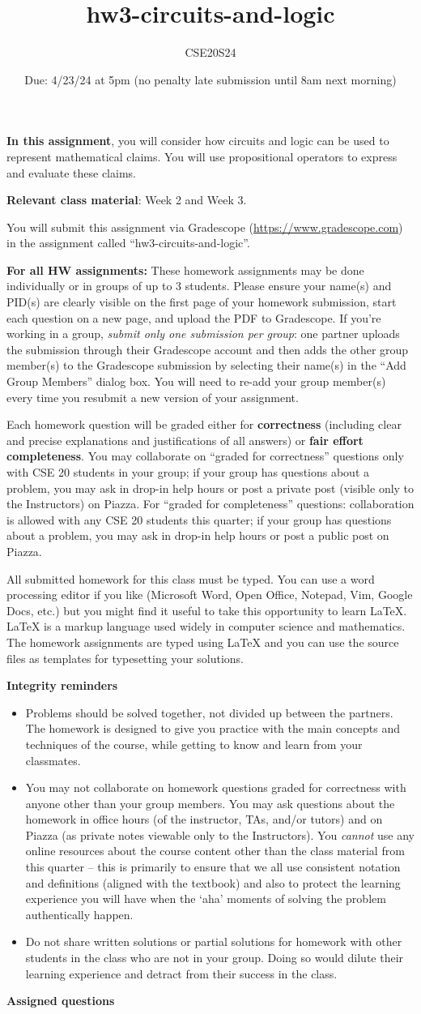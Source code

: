 \documentclass[12pt, oneside]{article}
\author{CSE20S24}
\title{hw3-circuits-and-logic}
\date{Due: 4/23/24 at 5pm (no penalty late submission until 8am next morning)}
\newcommand{\instructions}{{\bf For all HW assignments:} 
These homework assignments may be done individually or in groups of up to 3 students.
Please ensure your name(s) and PID(s)
are clearly visible on the first page of your homework
submission, start each question on a new page, and upload the PDF to Gradescope.
If you're working in a group, {\it submit only one submission per group}: one partner uploads the
submission through their Gradescope account and then adds the other group member(s) to the Gradescope submission
by selecting their name(s) in the ``Add Group Members'' dialog box. You will need to re-add your group member(s)
every time you resubmit a new version of your assignment.

Each homework question will be graded either for
{\bf correctness} (including clear and precise explanations and justifications of all answers) or
{\bf fair effort completeness}. You may collaborate on ``graded for correctness''
questions only with CSE 20 students in your group; if your
 group has questions about a problem, you may ask in drop-in help hours or post a private
post (visible only to the Instructors) on Piazza.  
 For ``graded for completeness''
 questions: collaboration is allowed with any CSE 20 students this quarter; 
 if your group has questions about a problem, you may ask in drop-in 
 help hours or post a public post on Piazza.

All submitted homework for this class must be typed. 
You can use a word processing editor if you like (Microsoft Word, Open Office, Notepad, Vim, Google Docs, etc.) 
but you might find it useful to take this opportunity to learn LaTeX. 
LaTeX is a markup language used widely in computer science and mathematics. 
The homework assignments are typed using LaTeX and you can use the source files 
as templates for typesetting your solutions.

{\bf Integrity reminders}
\begin{itemize}
\item Problems should be solved together, not divided up between the partners. The homework is
designed to give you practice with the main concepts and techniques of the course, 
while getting to know and learn from your classmates.
\item You may not collaborate on homework questions graded for correctness with anyone other than your group members.
You may ask questions about the homework in office hours (of the instructor, TAs, and/or tutors) and 
on Piazza (as private notes viewable only to the Instructors).  
You \emph{cannot} use any online resources about the course content other than the class material 
from this quarter -- this is primarily to ensure that we all use consistent notation and
definitions (aligned with the textbook) and also to protect the learning experience you will have when
the `aha' moments of solving the problem authentically happen.
\item Do not share written solutions or partial solutions for homework with 
other students in the class who are not in your group. Doing so would dilute their learning 
experience and detract from their success in the class.
\end{itemize}

}
\begin{document}
\maketitle
\thispagestyle{fancy}

{\bf In this assignment}, you will consider how circuits and logic can be used to represent
mathematical claims. You will use propositional operators
to express and evaluate these claims.

{\bf Relevant class material}: Week 2 and Week 3.

You will submit this assignment via Gradescope
(\href{https://www.gradescope.com}{https://www.gradescope.com}) 
in the assignment called ``hw3-circuits-and-logic''.

\instructions

{\bf Assigned questions}
\end{document}
